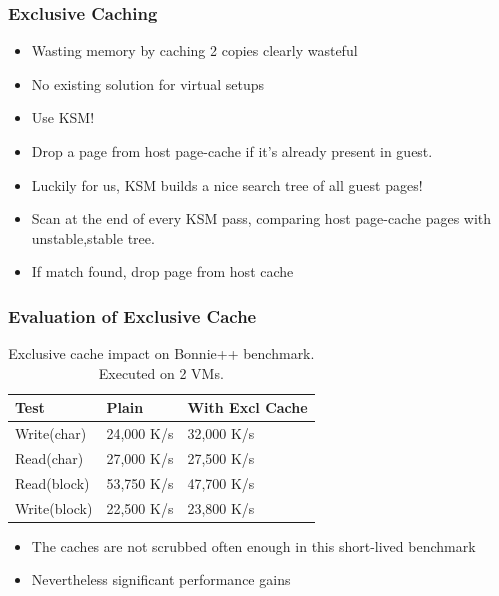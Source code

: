 \documentclass{beamer}
\begin{document}
\begin{frame}
  \frametitle{Exclusive Caching}
  \begin{itemize}

  \item {Wasting memory by caching 2 copies clearly wasteful}
  \item {No existing solution for virtual setups}
  \item \alert{Use KSM!}
  \item Drop a page from host page-cache if it's already present in guest.
  \item Luckily for us, KSM builds a nice search tree of all guest pages!
  \item Scan at the end of every KSM pass, comparing host page-cache pages with unstable,stable tree.
 \item If match found, drop page from host cache
 \end{itemize}
\end{frame}

\begin{frame}
  \frametitle{Evaluation of Exclusive Cache}

\begin{table}
\begin{center}
\begin{tabular}{|l|l|l|}

\hline
 Test          &  Plain       &  With Excl Cache  \\
\hline
 Write(char)   &  24,000 K/s  &  32,000 K/s       \\
 Read(char)    &  27,000 K/s  &  27,500 K/s       \\
\hline
 Read(block)   &  53,750 K/s  &  47,700 K/s       \\
 Write(block)  &  22,500 K/s  &  23,800 K/s       \\
\hline
\end{tabular}
\caption{Exclusive cache impact on Bonnie++ benchmark. Executed on 2 VMs. }
\end{center}
\end{table}

\begin{itemize}
\item The caches are not scrubbed often enough in this short-lived benchmark
\item Nevertheless significant performance gains
\end{itemize}

\end{frame}
\end{document}
